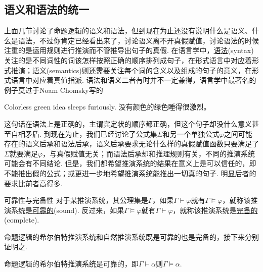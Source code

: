 \documentclass[main.tex]{subfiles}
\begin{document}
\vspace{1cm}

\subsection{语义和语法的统一}

上面几节讨论了命题逻辑的语义和语法，但到现在为止还没有说明什么是语义、什么是语法，不过你肯定已经看出来了，讨论语义离不开真假赋值，讨论语法的时候注重的是运用规则进行推演而不管推导出句子的真假. 在语言学中，\uline{语法}(syntax)关注的是不同词性的词该怎样按照正确的顺序排列成句子，在形式语言中对应着形式推演；\uline{语义}(semantics)则还需要关注每个词的含义以及组成的句子的意义，在形式语言中对应着真值指派. 语法和语义二者有时并不一定兼得，语言学中最著名的例子莫过于Noam Chomsky写的
\begin{reference}
    Colorless green idea sleeps furiously. \newline
    没有颜色的绿色睡得很激烈。
\end{reference}
这句话在语法上是正确的，主谓宾定状的顺序都正确，但这个句子却没什么意义甚至自相矛盾. 到现在为止，我们已经讨论了公式集\(\Sigma\)和另一个单独公式\(\varphi\)之间可能存在的语义后承和语法后承，语义后承要求无论什么样的真假赋值函数只要满足了\(\Sigma\)就要满足\(\varphi\)，与真假赋值无关；而语法后承却和推理规则有关，不同的推演系统可能会有不同结论. 但是，我们都希望推演系统的结果在意义上是可以信任的，即不能推出假的公式；或更进一步地希望推演系统能推出一切真的句子. 明显后者的要求比前者高得多.

\begin{definition}{可靠性与完备性}
    对于某推演系统，其公理集是\(\Gamma\)，如果\(\Gamma \vdash \varphi\)就有\(\Gamma \vDash \varphi\)，就称该推演系统是\uline{可靠的}(sound). \newline
    反过来，如果\(\Gamma \vDash \varphi\)就有\(\Gamma \vdash \varphi\)，就称该推演系统是\uline{完备的}(complete).
\end{definition}

命题逻辑的希尔伯特推演系统和自然推演系统既是可靠的也是完备的，接下来分别证明之.

\begin{theorem}{}
    命题逻辑的希尔伯特推演系统是可靠的，即\(\Gamma \vdash \alpha\)则\(\Gamma \vDash \alpha\).
\end{theorem}
\end{document}
